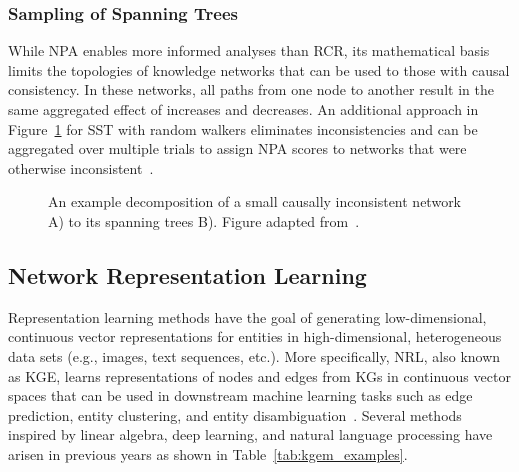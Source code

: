 \subsubsection{Sampling of Spanning Trees}

While \ac{NPA} enables more informed analyses than \ac{RCR}, its mathematical basis limits the topologies of knowledge networks that can be used to those with causal consistency.
In these networks, all paths from one node to another result in the same aggregated effect of increases and decreases.
An additional approach in Figure~\ref{fig:sst_schematic} for \ac{SST} with random walkers eliminates inconsistencies and can be aggregated over multiple trials to assign \ac{NPA} scores to networks that were otherwise inconsistent~\cite{Vasilyev2014}.

\begin{figure}
    \captionsetup{format=plain}
    \caption[Decomposition of Spanning Trees]{An example decomposition of a small causally inconsistent network A) to its spanning trees B). Figure adapted from~\cite{Vasilyev2014}.}
    \label{fig:sst_schematic}
\end{figure}

\subsection{Network Representation Learning}
\label{subsec:nrl}

Representation learning methods have the goal of generating low-dimensional, continuous vector representations for entities in high-dimensional, heterogeneous data sets (e.g., images, text sequences, etc.).
More specifically, \ac{NRL}, also known as \ac{KGE}, learns representations of nodes and edges from \acp{KG} in continuous vector spaces that can be used in downstream machine learning tasks such as edge prediction, entity clustering, and entity disambiguation~\cite{Wang2017}.
Several methods inspired by linear algebra, deep learning, and natural language processing have arisen in previous years as shown in Table~\ref{tab:kgem_examples}.

